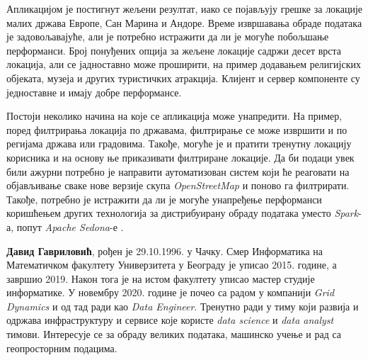 \documentclass[12pt,oneside]{memoir}
\begin{document}
Апликацијом је постигнут жељени резултат, иако се појављују грешке за локације малих држава Европе, Сан Марина и Андоре. Време извршавања обраде података је задовољавајуће, али је потребно истражити да ли је могуће побољшање перформанси. Број понуђених опција за жељене локације садржи десет врста локација, али се јадноставно може проширити, на пример додавањем религијских објеката, музеја и других туристичких атракција. Клијент и сервер компоненте су једноставне и имају добре перформансе.

Постоји неколико начина на које се апликација може унапредити. На пример, поред филтрирања локација по државама, филтрирање се може извршити и по регијама држава или градовима. Такође, могуће је и пратити тренутну локацију корисника и на основу ње приказивати филтриране локације. Да би подаци увек били ажурни потребно је направити аутоматизован систем који ће реаговати на објављивање сваке нове верзије скупа \textit{OpenStreetMap} и поново га филтрирати. Такође, потребно је истражити да ли је могуће унапређење перформанси коришћењем других технологија за дистрибуирану обраду података уместо \textit{Spark}-а, попут  \textit{Apache Sedona}-е \cite{apache_sedona}.



\literatura

\backmatter

\begin{biografija}
\textbf{Давид Гавриловић}, рођен је 29.10.1996. у Чачку. Смер Информатика на Математичком факултету Универзитета у Београду је уписао 2015. године, а завршио 2019. Након тога је на истом факултету уписао мастер студије информатике. У новембру 2020. године је почео са радом у компанији \textit{Grid Dynamics} и од тад ради као \textit{Data Engineer}. Тренутно ради у тиму који развија и одржава инфраструктуру и сервисе које користе \textit{data science} и \textit{data analyst} тимови. Интересује се за обраду великих података, машинско учење и рад са геопросторним подацима.
\end{biografija}
\end{document}
